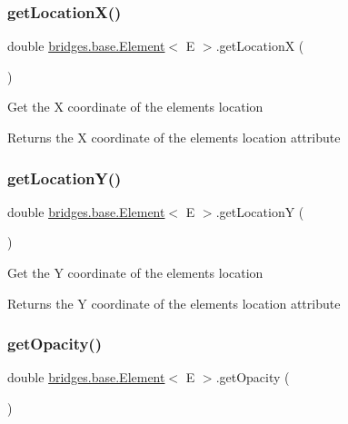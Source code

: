 \subsubsection{\texorpdfstring{get\+Location\+X()}{getLocationX()}}
{\footnotesize\ttfamily double \hyperlink{classbridges_1_1base_1_1_element}{bridges.\+base.\+Element}$<$ E $>$.get\+LocationX (\begin{DoxyParamCaption}{ }\end{DoxyParamCaption})}

Get the X coordinate of the element\textquotesingle{}s location \begin{DoxyReturn}{Returns}
the X coordinate of the element\textquotesingle{}s location attribute 
\end{DoxyReturn}
\mbox{\label{classbridges_1_1base_1_1_element_a3cfd6af5ca4cae0596845f62018ce004}} 
\subsubsection{\texorpdfstring{get\+Location\+Y()}{getLocationY()}}
{\footnotesize\ttfamily double \hyperlink{classbridges_1_1base_1_1_element}{bridges.\+base.\+Element}$<$ E $>$.get\+LocationY (\begin{DoxyParamCaption}{ }\end{DoxyParamCaption})}

Get the Y coordinate of the element\textquotesingle{}s location \begin{DoxyReturn}{Returns}
the Y coordinate of the element\textquotesingle{}s location attribute 
\end{DoxyReturn}
\mbox{\label{classbridges_1_1base_1_1_element_a1427af7efc2d5bc93e00a6a95d268c4d}} 
\subsubsection{\texorpdfstring{get\+Opacity()}{getOpacity()}}
{\footnotesize\ttfamily double \hyperlink{classbridges_1_1base_1_1_element}{bridges.\+base.\+Element}$<$ E $>$.get\+Opacity (\begin{DoxyParamCaption}{ }\end{DoxyParamCaption})}

